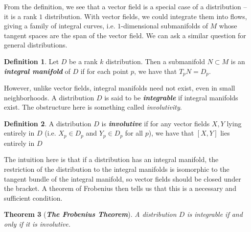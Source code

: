 \documentclass[psamsfonts]{amsart}
\newtheorem{thm}{Theorem}[section]
\theoremstyle{definition}
\newtheorem{defn}[thm]{Definition}
\theoremstyle{remark}
\newcommand{\ib}[1]{\textbf{\textit{#1}}}
\begin{document}
%
From the definition, we see that a vector field is a special case of a distribution --
it is a rank $1$ distribution. With vector fields, we could integrate them into
flows, giving a family of integral curves, i.e. $1$-dimensional submanifolds of
$M$ whose tangent spaces are the span of the vector field. We can ask a similar
question for general distributions.
%
\begin{defn}
Let $D$ be a rank $k$ distribution. Then a submanifold $N \subset M$ is an
\ib{integral manifold} of $D$ if for each point $p$, we have that $T_pN = D_p$.
\end{defn}
%
However, unlike vector fields, integral manifolds need not exist, even in small
neighborhoods. A distribution $D$ is said to be \ib{integrable} if
integral manifolds exist. The obstructure here is something called
\emph{involutivity}.
%
\begin{defn}
A distribution $D$ is \ib{involutive} if for any vector fields $X,Y$ lying
entirely in $D$ (i.e. $X_p \in D_p$ and $Y_p \in D_p$ for all $p$), we
have that $[X,Y]$ lies entirely in $D$
\end{defn}
%
The intuition here is that if a distribution has an integral manifold, the restriction
of the distribution to the integral manifolds is isomorphic to the tangent
bundle of the integral manifold, so vector fields should be closed
under the bracket. A theorem of Frobenius then tells us that this is a necessary
and sufficient condition.
%
\begin{thm}[\ib{The Frobenius Theorem}]
A distribution $D$ is integrable if and only if it is involutive.
\end{thm}
%
\end{document}
